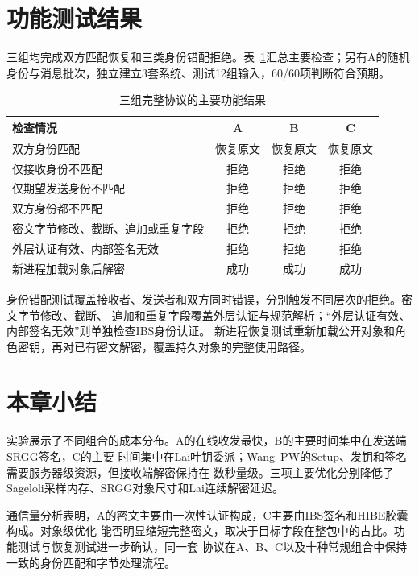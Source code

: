 \section{功能测试结果}
三组均完成双方匹配恢复和三类身份错配拒绝。表~\ref{tab:functional}汇总主要检查；另有A的随机身份与消息批次，独立建立3套系统、测试12组输入，60/60项判断符合预期。

\begin{table}[H]
\centering\small
\caption{三组完整协议的主要功能结果}
\label{tab:functional}
\begin{tabularx}{\textwidth}{@{}Xccc@{}}
\toprule
\rowcolor{black!8} 检查情况 & A & B & C \\
\midrule
双方身份匹配 & 恢复原文 & 恢复原文 & 恢复原文 \\
仅接收身份不匹配 & 拒绝 & 拒绝 & 拒绝 \\
仅期望发送身份不匹配 & 拒绝 & 拒绝 & 拒绝 \\
双方身份都不匹配 & 拒绝 & 拒绝 & 拒绝 \\
密文字节修改、截断、追加或重复字段 & 拒绝 & 拒绝 & 拒绝 \\
外层认证有效、内部签名无效 & 拒绝 & 拒绝 & 拒绝 \\
新进程加载对象后解密 & 成功 & 成功 & 成功 \\
\bottomrule
\end{tabularx}
\end{table}

身份错配测试覆盖接收者、发送者和双方同时错误，分别触发不同层次的拒绝。密文字节修改、截断、
追加和重复字段覆盖外层认证与规范解析；“外层认证有效、内部签名无效”则单独检查IBS身份认证。
新进程恢复测试重新加载公开对象和角色密钥，再对已有密文解密，覆盖持久对象的完整使用路径。

\section{本章小结}

实验展示了不同组合的成本分布。A的在线收发最快，B的主要时间集中在发送端SRGG签名，C的主要
时间集中在Lai叶钥委派；Wang--PW的Setup、发钥和签名需要服务器级资源，但接收端解密保持在
数秒量级。三项主要优化分别降低了Sageloli采样内存、SRGG对象尺寸和Lai连续解密延迟。

通信量分析表明，A的密文主要由一次性认证构成，C主要由IBS签名和HIBE胶囊构成。对象级优化
能否明显缩短完整密文，取决于目标字段在整包中的占比。功能测试与恢复测试进一步确认，同一套
协议在A、B、C以及十种常规组合中保持一致的身份匹配和字节处理流程。
